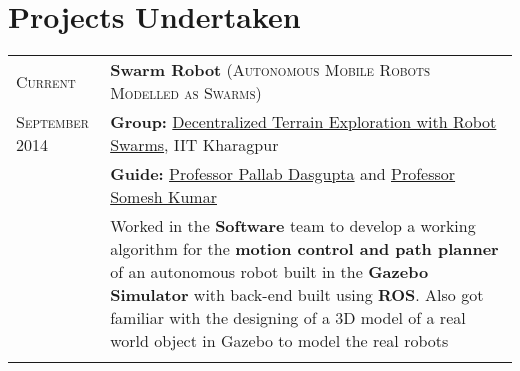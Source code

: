 \documentclass[a4paper,10pt]{extarticle} %
\begin{document}
\section{Projects Undertaken}

\begin{tabular}{R{3.0cm}|p{15.0cm}}
\textsc{Current} & \textbf{Swarm Robot} \textsc{(Autonomous Mobile Robots Modelled as Swarms)} \\
\textsc{September 2014} & \textbf{Group: }\textmd{\href{https://github.com/Swarm-IITKgp}{Decentralized Terrain Exploration with Robot Swarms}}, IIT Kharagpur\\
& \textbf{Guide: }\textmd{\href{http://www.iitkgp.ac.in/fac-profiles/showprofile.php?empcode=aWmVT}{Professor Pallab Dasgupta}} and \textmd{\href{http://www.iitkgp.ac.in/fac-profiles/showprofile.php?empcode=aVmWZ}{Professor Somesh Kumar}}\\
& \footnotesize{Worked in the \textbf{Software} team to develop a working algorithm for the \textbf{motion control and path planner} of an autonomous robot built in the \textbf{Gazebo Simulator} with back-end built using \textbf{ROS}. Also got familiar with the designing of a 3D model of a real world object in Gazebo to model the real robots}\\
 \\



\end{tabular}
\end{document}
